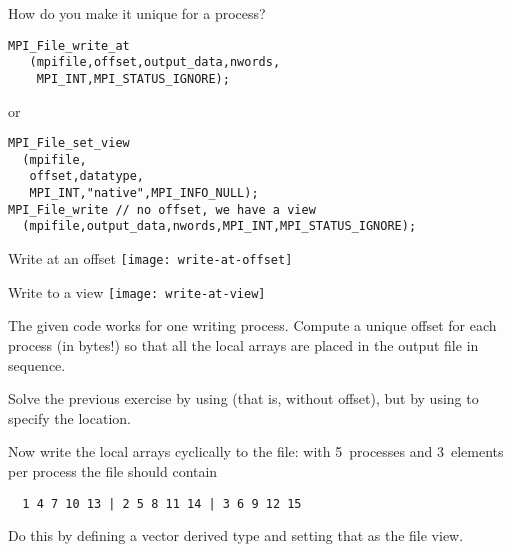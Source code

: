 \begin{frame}[containsverbatim]{How do you make it unique for a process?}
\lstset{language=C}
\begin{lstlisting}
MPI_File_write_at
   (mpifile,offset,output_data,nwords,
    MPI_INT,MPI_STATUS_IGNORE);
\end{lstlisting}
or
\begin{lstlisting}
MPI_File_set_view
  (mpifile,
   offset,datatype,
   MPI_INT,"native",MPI_INFO_NULL);
MPI_File_write // no offset, we have a view
  (mpifile,output_data,nwords,MPI_INT,MPI_STATUS_IGNORE);
\end{lstlisting}
\end{frame}

\begin{frame}{Write at an offset}
  \texttt{[image: write-at-offset]}
\end{frame}

\begin{frame}{Write to a view}
  \texttt{[image: write-at-view]}
\end{frame}

\begin{exerciseframe}[blockwrite]
  The given code works for one writing process. Compute a unique
  offset for each process (in bytes!) so that all the local arrays are
  placed in the output file in sequence.
\end{exerciseframe}

\begin{exerciseframe}[viewwrite]
  Solve the previous exercise by using  (that is,
  without offset), but by using  to specify the location.
\end{exerciseframe}

\begin{exerciseframe}[scatterwrite]
  Now write the local arrays cyclically to the file: with 5~processes
  and 3~elements per process the file should contain
\begin{verbatim}
  1 4 7 10 13 | 2 5 8 11 14 | 3 6 9 12 15
\end{verbatim}
  Do this by defining a vector derived type and setting that as the
  file view.
\end{exerciseframe}

\endinput

\begin{frame}[containsverbatim]\frametitle{}
\begin{verbatim}

\end{verbatim}
\end{frame}

